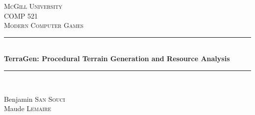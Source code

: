 \begin{titlepage}

\newcommand{\HRule}{\rule{\linewidth}{0.5mm}} %

\center %


\textsc{\LARGE McGill University}\\[1.5cm] %
\textsc{\Large COMP 521}\\[0.5cm] %
\textsc{\large Modern Computer Games}\\[0.5cm] %


\HRule \\[0.4cm]
{ \huge \bfseries TerraGen: Procedural Terrain Generation and Resource Analysis}\\[0.4cm] %
\HRule \\[1.0cm]


\begin{minipage}{0.4\textwidth}
\begin{flushleft} \large
Benjamin \textsc{San Souci} \\ %
Maude \textsc{Lemaire} %
\end{flushleft}
\end{minipage}
~
\begin{minipage}{0.4\textwidth}
\end{minipage}\\[4cm]



\end{titlepage}

